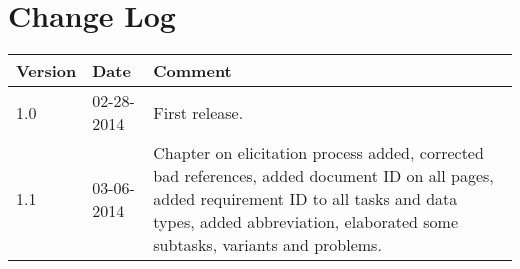 \documentclass[Main]{subfiles}
\begin{document}
\section*{Change Log}

\begin{table}[H]

\begin{tabular}{p{} p{} p{}}
\hline
\textbf{Version} & \textbf{Date} & \textbf{Comment} \\\hline
1.0 & 02-28-2014 & First release. \\
1.1 & 03-06-2014 & Chapter on elicitation process added, corrected bad references, added document ID on all pages, added requirement ID to all tasks and data types, added abbreviation, elaborated some subtasks, variants and problems.\\
\hline
\end{tabular}

\end{table}
\end{document}
